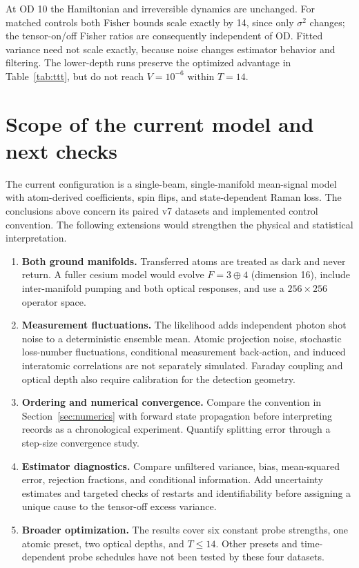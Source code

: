 \documentclass[11pt]{article}
\begin{document}
At OD 10 the Hamiltonian and irreversible dynamics are unchanged. For matched
controls both Fisher bounds scale exactly by 14, since only $\sigma^2$ changes;
the tensor-on/off Fisher ratios are consequently independent of OD. Fitted
variance need not scale exactly, because noise changes estimator behavior and
filtering. The lower-depth runs preserve the optimized advantage in
Table~\ref{tab:ttt}, but do not reach $V=10^{-6}$ within $T=14$.

\FloatBarrier
\section{Scope of the current model and next checks}

The current configuration is a single-beam, single-manifold mean-signal model
with atom-derived coefficients, spin flips, and state-dependent Raman loss.
The conclusions above concern its paired v7 datasets and implemented control
convention. The following extensions would strengthen the physical and
statistical interpretation.

\begin{enumerate}
\item \textbf{Both ground manifolds.} Transferred atoms are treated as dark and
never return. A fuller cesium model would evolve $F=3\oplus4$ (dimension 16),
include inter-manifold pumping and both optical responses, and use a
$256\times256$ operator space.
\item \textbf{Measurement fluctuations.} The likelihood adds independent photon
shot noise to a deterministic ensemble mean. Atomic projection noise,
stochastic loss-number fluctuations, conditional measurement back-action,
and induced interatomic correlations are not separately simulated. Faraday
coupling and optical depth also require calibration for the detection geometry.
\item \textbf{Ordering and numerical convergence.} Compare the convention in
Section~\ref{sec:numerics} with forward state propagation before interpreting
records as a chronological experiment. Quantify splitting error through a
step-size convergence study.
\item \textbf{Estimator diagnostics.} Compare unfiltered variance, bias,
mean-squared error, rejection fractions, and conditional information. Add
uncertainty estimates and targeted checks of restarts and identifiability before
assigning a unique cause to the tensor-off excess variance.
\item \textbf{Broader optimization.} The results cover six constant probe
strengths, one atomic preset, two optical depths, and $T\le14$. Other presets
and time-dependent probe schedules have not been tested by these four datasets.
\end{enumerate}
\end{document}
